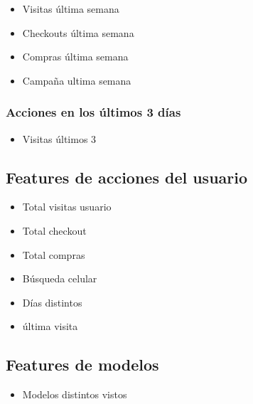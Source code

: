 \documentclass[a4paper ,12pt]{article}
\begin{document}
			\begin{itemize}
				\item  Visitas última semana
				\item  Checkouts última semana
				\item  Compras última semana 
				\item Campaña ultima semana
			\end{itemize}
			

		\subsubsection{Acciones en los últimos 3 días}
		
		
		
			\begin{itemize}
				\item Visitas últimos 3
			\end{itemize}





\subsection{Features de acciones del usuario}

	\begin{itemize}
		\item Total visitas usuario
		
		\item Total checkout
		
		\item Total compras
		
		\item Búsqueda celular 
		
		\item Días distintos 
		
		\item última visita 
		
	\end{itemize}
	


\subsection{Features de modelos}

	\begin{itemize}
		
		\item Modelos distintos vistos
			
	\end{itemize}	
\end{document}
